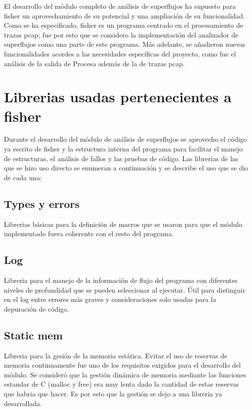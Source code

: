\documentclass[twoside, 12pt]{epstfg}
\begin{document}
El desarrollo del módulo completo de análisis de superflujos ha supuesto para fisher un aprovechamiento de su potencial y una ampliación de su funcionalidad. Como se ha especificado, fisher es un programa centrado en el procesamiento de trazas pcap; fue por esto que se considero la implementación del analizador de superflujos como una parte de este programa. Más adelante, se añadieron nuevas funcionalidades acordes a las necesidades específicas del proyecto, como fue el análisis de la salida de Procesa además de la de trazas pcap.


\section{Librerias usadas pertenecientes a fisher}
Durante el desarrollo del módulo de análisis de superflujos se aprovecho el código ya escrito de fisher y la estructura interna del programa para facilitar el manejo de estructuras, el análisis de fallos y las pruebas de código. Las librerias de las que se hizo uso directo se enumeran a continuación y se describe el uso que se dio de cada una:
\subsection{Types y errors}
Librerias básicas para la definición de macros que se usaron para que el módulo implementado fuera coherente con el resto del programa.
\subsection{Log} 
Libreria para el manejo de la información de flujo del programa con diferentes niveles de profundidad que se pueden seleccionar al ejecutar. Útil para distinguir en el log entre errores más graves y consideraciones solo usadas para la depuración de código.
\subsection{Static mem}
Libreria para la gesión de la memoria estática. Evitar el uso de reservas de memoria continuamente fue uno de los requisitos exigidos para el desarrollo del módulo. Se consideró que la gestión dinámica de memoria mediante las funciones estandar de C (malloc y free) era muy lenta dado la cantidad de estas reservas que habria que hacer. Es por esto que la gestión se dejo a una libreria ya desarrollada. 
\end{document}
